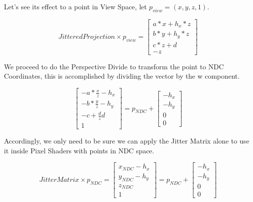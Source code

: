 \documentclass[pregrado]{tesis-usb} %
\begin{document}
Let’s see its effect to a point in View Space, let $p_{view}=(x,y,z,1)$.

\begin{equation}
	JitteredProjection\times p_{view} = \begin{bmatrix*}
	a*x+h_x*z \\
	b*y+h_y*z \\
	c*z+d \\
	-z
	\end{bmatrix*}
\end{equation}

We proceed to do the Perspective Divide to transform the point to NDC Coordinates, this is accomplished by dividing the vector by the w component.

\begin{equation}
\begin{bmatrix*}
-a*\frac{x}{z}-h_x \\
-b*\frac{y}{z}-h_y \\
-c+\frac{d}{z}d \\
1
\end{bmatrix*} = p_{NDC} + \begin{bmatrix*}
-h_x \\
-h_y \\
0 \\
0
\end{bmatrix*}
\end{equation}

Accordingly, we only need to be sure we can apply the Jitter Matrix alone to use it inside Pixel Shaders with points in NDC space. 

\begin{equation}
	JitterMatrix\times p_{NDC} = \begin{bmatrix*}
	x_{NDC}-h_x \\
	y_{NDC}-h_y \\
	z_{NDC} \\
	1
	\end{bmatrix*} = p_{NDC} + \begin{bmatrix*}
	-h_x \\
	-h_y \\
	0 \\
	0
	\end{bmatrix*}
\end{equation}
\end{document}
